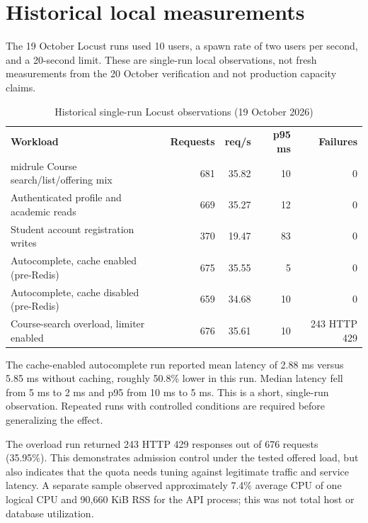 \documentclass[11pt,a4paper,oneside]{report}
\begin{document}
\section{Historical local measurements}
The 19 October Locust runs used 10 users, a spawn rate of two users per second, and a 20-second limit. These are single-run local observations, not fresh measurements from the 20 October verification and not production capacity claims.
\begin{table}[htbp]
\centering\small
\caption{Historical single-run Locust observations (19 October 2026)}\label{tab:locust}
\begin{tabularx}{\linewidth}{@{}Xrrrr@{}}\toprule
\textbf{Workload} & \textbf{Requests} & \textbf{req/s} & \textbf{p95 ms} & \textbf{Failures} \\midrule
Course search/list/offering mix & 681 & 35.82 & 10 & 0 \\
Authenticated profile and academic reads & 669 & 35.27 & 12 & 0 \\
Student account registration writes & 370 & 19.47 & 83 & 0 \\
Autocomplete, cache enabled (pre-Redis) & 675 & 35.55 & 5 & 0 \\
Autocomplete, cache disabled (pre-Redis) & 659 & 34.68 & 10 & 0 \\
Course-search overload, limiter enabled & 676 & 35.61 & 10 & 243 HTTP 429 \\
\bottomrule\end{tabularx}
\end{table}

The cache-enabled autocomplete run reported mean latency of 2.88 ms versus 5.85 ms without caching, roughly 50.8\% lower in this run. Median latency fell from 5 ms to 2 ms and p95 from 10 ms to 5 ms. This is a short, single-run observation. Repeated runs with controlled conditions are required before generalizing the effect.

The overload run returned 243 HTTP 429 responses out of 676 requests (35.95\%). This demonstrates admission control under the tested offered load, but also indicates that the quota needs tuning against legitimate traffic and service latency. A separate sample observed approximately 7.4\% average CPU of one logical CPU and 90,660 KiB RSS for the API process; this was not total host or database utilization.
\end{document}

